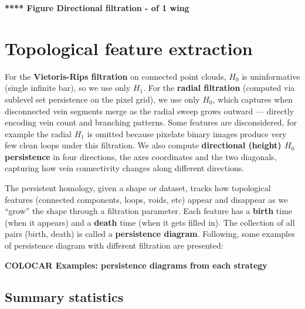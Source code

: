 \documentclass{birkjour}
\theoremstyle{definition}
\theoremstyle{remark}
\numberwithin{equation}{section}
\begin{document}
\textbf{**** Figure Directional filtration - of 1 wing}














\section{Topological feature extraction}\quad

For the \textbf{Vietoris-Rips filtration} on connected point clouds, \(H_0\) is uninformative (single infinite bar), so we use only \(H_1\). 
For the \textbf{radial filtration} (computed via sublevel set persistence on the pixel grid), we use only \(H_0\), which captures when disconnected vein segments merge as the radial sweep grows outward — directly encoding vein count and branching patterns. 
Some features are disconsidered, for example the radial \(H_1\) is omitted because pixelate binary images produce very few clean loops under this filtration. 
We also compute \textbf{directional (height) \(H_0\) persistence} in four directions, the axes coordinates and the two diagonals, capturing how vein connectivity changes along different directions.


The persistent homology, given a shape or dataset, tracks how topological features (connected components, loops, voids, etc) appear and disappear as we “grow” the shape through a filtration parameter. 
Each feature has a \textbf{birth} time (when it appears) and a \textbf{death} time (when it gets filled in). 
The collection of all pairs (birth, death) is called a \textbf{persistence diagram}.  Following, some examples of persistence diagram with different filtration are presented: 

\noindent \textbf{COLOCAR Examples: persistence diagrams from each strategy}


\subsection{Summary statistics}\quad
\end{document}

